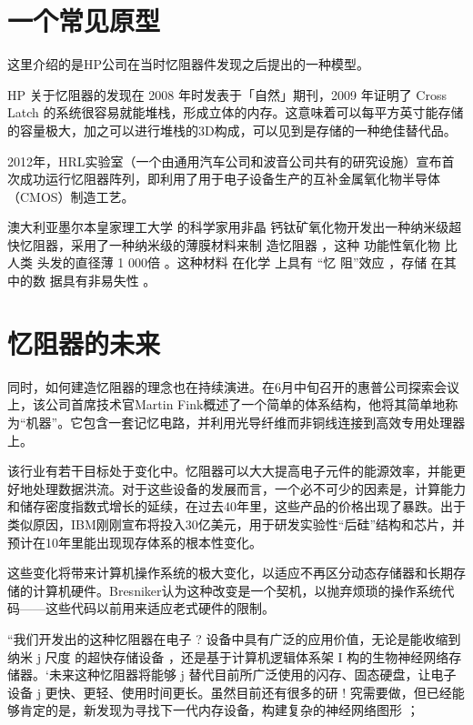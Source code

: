 \documentclass[UTF8]{article}
\begin{document}






\section{一个常见原型}
这里介绍的是HP公司在当时忆阻器件发现之后提出的一种模型。



HP 关于忆阻器的发现在 2008 年时发表于「自然」期刊，2009 年证明了 Cross Latch 的系统很容易就能堆栈，形成立体的内存。这意味着可以每平方英寸能存储的容量极大，加之可以进行堆栈的3D构成，可以见到是存储的一种绝佳替代品。

2012年，HRL实验室（一个由通用汽车公司和波音公司共有的研究设施）宣布首次成功运行忆阻器阵列，即利用了用于电子设备生产的互补金属氧化物半导体（CMOS）制造工艺。

澳大利亚墨尔本皇家理工大学 的科学家用非晶 钙钛矿氧化物开发出一种纳米级超快忆阻器，采用了一种纳米级的薄膜材料来制 造忆阻器 ，这种 功能性氧化物 比人类 头发的直径薄 1 000倍 。这种材料 在化学 上具有 “忆 阻”效应 ，存储 在其 中的数 据具有非易失性 。 



\section{忆阻器的未来}
 同时，如何建造忆阻器的理念也在持续演进。在6月中旬召开的惠普公司探索会议上，该公司首席技术官Martin Fink概述了一个简单的体系结构，他将其简单地称为“机器”。它包含一套记忆电路，并利用光导纤维而非铜线连接到高效专用处理器上。

该行业有若干目标处于变化中。忆阻器可以大大提高电子元件的能源效率，并能更好地处理数据洪流。对于这些设备的发展而言，一个必不可少的因素是，计算能力和储存密度指数式增长的延续，在过去40年里，这些产品的价格出现了暴跌。出于类似原因，IBM刚刚宣布将投入30亿美元，用于研发实验性“后硅”结构和芯片，并预计在10年里能出现现存体系的根本性变化。

这些变化将带来计算机操作系统的极大变化，以适应不再区分动态存储器和长期存储的计算机硬件。Bresniker认为这种改变是一个契机，以抛弃烦琐的操作系统代码——这些代码以前用来适应老式硬件的限制。

“我们开发出的这种忆阻器在电子 ? 设备中具有广泛的应用价值，无论是能收缩到纳米 j 尺度 的超快存储设备 ，还是基于计算机逻辑体系架 I 构的生物神经网络存储器。‘未来这种忆阻器将能够 j 替代目前所广泛使用的闪存、固态硬盘，让电子设备 j 更快、更轻、使用时间更长。虽然目前还有很多的研 ! 究需要做，但已经能够肯定的是，新发现为寻找下一代内存设备，构建复杂的神经网络图形 ； 
\end{document}
